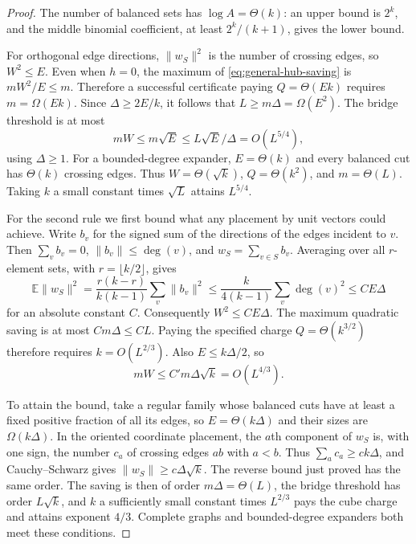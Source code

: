\begin{proof}
The number of balanced sets has $\log A=\Theta(k)$: an upper bound is $2^k$, and the middle binomial coefficient, at least $2^k/(k+1)$, gives the lower bound.

For orthogonal edge directions, $\|w_S\|^2$ is the number of crossing edges, so $W^2\leq E$. Even when $h=0$, the maximum of \eqref{eq:general-hub-saving} is $mW^2/E\leq m$. Therefore a successful certificate paying $Q=\Theta(Ek)$ requires $m=\Omega(Ek)$. Since $\Delta\geq2E/k$, it follows that $L\geq m\Delta=\Omega(E^2)$. The bridge threshold is at most
\[
 mW\leq m\sqrt E\leq L\sqrt E/\Delta=O(L^{5/4}),
\]
using $\Delta\geq1$. For a bounded-degree expander, $E=\Theta(k)$ and every balanced cut has $\Theta(k)$ crossing edges. Thus $W=\Theta(\sqrt k)$, $Q=\Theta(k^2)$, and $m=\Theta(L)$. Taking $k$ a small constant times $\sqrt L$ attains $L^{5/4}$.

For the second rule we first bound what any placement by unit vectors could achieve. Write $b_v$ for the signed sum of the directions of the edges incident to $v$. Then $\sum_v b_v=0$, $\|b_v\|\leq\deg(v)$, and $w_S=\sum_{v\in S}b_v$. Averaging over all $r$-element sets, with $r=\lfloor k/2\rfloor$, gives
\[
 \mathbb E\|w_S\|^2
 =\frac{r(k-r)}{k(k-1)}\sum_v\|b_v\|^2
 \leq\frac{k}{4(k-1)}\sum_v\deg(v)^2
 \leq C E\Delta
\]
for an absolute constant $C$. Consequently $W^2\leq C E\Delta$. The maximum quadratic saving is at most $C m\Delta\leq CL$. Paying the specified charge $Q=\Theta(k^{3/2})$ therefore requires $k=O(L^{2/3})$. Also $E\leq k\Delta/2$, so
\[
 mW\leq C'm\Delta\sqrt k=O(L^{4/3}).
\]

To attain the bound, take a regular family whose balanced cuts have at least a fixed positive fraction of all its edges, so $E=\Theta(k\Delta)$ and their sizes are $\Omega(k\Delta)$. In the oriented coordinate placement, the $a$th component of $w_S$ is, with one sign, the number $c_a$ of crossing edges $ab$ with $a<b$. Thus $\sum_a c_a\geq c k\Delta$, and Cauchy--Schwarz gives $\|w_S\|\geq c\Delta\sqrt k$. The reverse bound just proved has the same order. The saving is then of order $m\Delta=\Theta(L)$, the bridge threshold has order $L\sqrt k$, and $k$ a sufficiently small constant times $L^{2/3}$ pays the cube charge and attains exponent $4/3$. Complete graphs and bounded-degree expanders both meet these conditions.
\end{proof}

